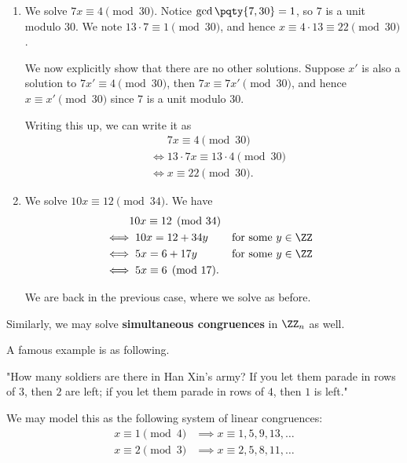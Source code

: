 \begin{examples}
    \begin{enumerate}
        \item We solve \(7x \equiv 4 \pmod{30}\). Notice \(\gcd\pqty{7, 30} = 1\), so \(7\) is a unit modulo \(30\). We note \(13 \cdot 7 \equiv 1 \pmod{30}\), and hence \(x \equiv 4 \cdot 13 \equiv 22 \pmod{30}\).
        
        We now explicitly show that there are no other solutions. Suppose \(x'\) is also a solution to \(7 x' \equiv 4 \pmod{30}\), then \(7x \equiv 7x' \pmod{30}\), and hence \(x \equiv x' \pmod{30}\) since \(7\) is a unit modulo \(30\).

        Writing this up, we can write it as
        \begin{align*}
            &\phantom{\iff} 7x \equiv 4 \pmod{30} \\
            &\iff 13 \cdot 7x \equiv 13 \cdot 4 \pmod{30} \\
            &\iff x \equiv 22 \pmod{30}.
        \end{align*}

        \item We solve \(10 x \equiv 12 \pmod{34}\). We have
        \begin{align*}
            &\phantom{\iff} 10x \equiv 12 \pmod{34} \\
            &\iff 10x = 12 + 34y && \text{for some } y \in \ZZ \\
            &\iff 5x = 6 + 17y && \text{for some } y \in \ZZ \\
            &\iff 5x \equiv 6 \pmod{17}.
        \end{align*}

        We are back in the previous case, where we solve as before.
    \end{enumerate}
\end{examples}

Similarly, we may solve \textbf{simultaneous congruences} in \(\ZZ_n\) as well.

\begin{example}
    A famous example is as following.

    "How many soldiers are there in Han Xin's army? If you let them parade in rows of \(3\), then \(2\) are left; if you let them parade in rows of \(4\), then \(1\) is left."

    We may model this as the following system of linear congruences:
    \begin{align*}
        x \equiv 1 \pmod{4} &\implies x \equiv 1, \boxed{5}, 9, 13, \ldots \\
        x \equiv 2 \pmod{3} &\implies x \equiv 2, \boxed{5}, 8, 11, \ldots
    \end{align*}
\end{example}

